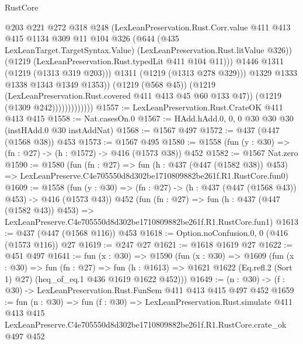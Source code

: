 \begin{lexlean}{RustCore}
\begin{coremodule}
                                  @203
                                  @221
                                  @272
                                  @318
                                  @248
                                  (LexLeanPreservation.Rust.Corr.value
                                    @411
                                    @413
                                    @415
                                    @1134
                                    @309
                                    @11
                                    @104
                                    @326
                                    (@644
                                      (@435 LexLeanTarget.TargetSyntax.Value)
                                      (LexLeanPreservation.Rust.litValue @326))
                                    (@1219 (LexLeanPreservation.Rust.typedLit @411 @104 @11)))
                                  @1446
                                  @1311
                                  (@1219 (@1313 @319 @203)))
                                @1311
                                (@1219 (@1313 @278 @329)))
                              @1329
                              @1333
                              @1338
                              @1343
                              @1349
                              @1353))
                          (@1219 (@568 @45))
                          (@1219 (LexLeanPreservation.Rust.covered @411 @413 @45 @60 @133 @47))
                          (@1219 (@1309 @242)))))))))))))
@1557 := LexLeanPreservation.Rust.CrateOK @411 @413 @415
@1558 := Nat.casesOn.{0}
@1567 := HAdd.hAdd.{0, 0, 0} @30 @30 @30 (instHAdd.{0} @30 instAddNat)
@1568 := @1567 @497
@1572 := @437 (@447 (@1568 @38)) @453
@1573 := @1567 @495
@1580 := @1558 (fun (y : @30) => (fn : @27) -> (h : @1572) -> @416 (@1573 @38)) @452
@1582 := @1567 Nat.zero
@1590 := @1580
    (fun (fn : @27) =>
    fun (h : @437 (@447 (@1582 @38)) @453) =>
    LexLeanPreserve.C4e705550d8d302be1710809882be261f.R1.RustCore.fun0)
@1609 := @1558
    (fun (y : @30) => (fn : @27) -> (h : @437 (@447 (@1568 @43)) @453) -> @416 (@1573 @43))
    @452
    (fun (fn : @27) =>
    fun (h : @437 (@447 (@1582 @43)) @453) =>
    LexLeanPreserve.C4e705550d8d302be1710809882be261f.R1.RustCore.fun1)
@1613 := @437 (@447 (@1568 @116)) @453
@1618 := Option.noConfusion.{0, 0} (@416 (@1573 @116)) @27
@1619 := @247 @27
@1621 := @1618 @1619 @27
@1622 := @451 @497
@1641 := fun (x : @30) =>
  @1590
    (fun (x : @30) =>
    @1609
      (fun (x : @30) =>
      fun (fn : @27) =>
      fun (h : @1613) =>
      @1621 @1622 (Eq.refl.{2} (Sort 1) @27) (heq_of_eq.{1} @436 @1619 @1622 @452)))
@1649 := (n : @30) -> (f : @30) -> LexLeanPreservation.Rust.FunSem @411 @413 @415 @497 @452
@1659 := fun (n : @30) =>
  fun (f : @30) =>
  LexLeanPreservation.Rust.simulate
    @411
    @413
    @415
    LexLeanPreserve.C4e705550d8d302be1710809882be261f.R1.RustCore.crate_ok
    @497
    @452
\end{coremodule}
\end{lexlean}
